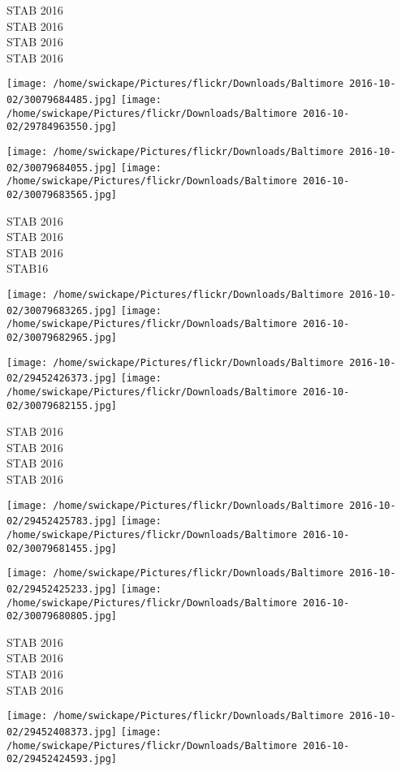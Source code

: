 \documentclass[10pt,letterpaper]{article}
\begin{document}
STAB 2016\\
STAB 2016\\
STAB 2016\\
STAB 2016
\pagebreak

\texttt{[image: /home/swickape/Pictures/flickr/Downloads/Baltimore 2016-10-02/30079684485.jpg]}
\texttt{[image: /home/swickape/Pictures/flickr/Downloads/Baltimore 2016-10-02/29784963550.jpg]}

\texttt{[image: /home/swickape/Pictures/flickr/Downloads/Baltimore 2016-10-02/30079684055.jpg]}
\texttt{[image: /home/swickape/Pictures/flickr/Downloads/Baltimore 2016-10-02/30079683565.jpg]}

STAB 2016\\
STAB 2016\\
STAB 2016\\
STAB16
\pagebreak

\texttt{[image: /home/swickape/Pictures/flickr/Downloads/Baltimore 2016-10-02/30079683265.jpg]}
\texttt{[image: /home/swickape/Pictures/flickr/Downloads/Baltimore 2016-10-02/30079682965.jpg]}

\texttt{[image: /home/swickape/Pictures/flickr/Downloads/Baltimore 2016-10-02/29452426373.jpg]}
\texttt{[image: /home/swickape/Pictures/flickr/Downloads/Baltimore 2016-10-02/30079682155.jpg]}

STAB 2016\\
STAB 2016\\
STAB 2016\\
STAB 2016
\pagebreak

\texttt{[image: /home/swickape/Pictures/flickr/Downloads/Baltimore 2016-10-02/29452425783.jpg]}
\texttt{[image: /home/swickape/Pictures/flickr/Downloads/Baltimore 2016-10-02/30079681455.jpg]}

\texttt{[image: /home/swickape/Pictures/flickr/Downloads/Baltimore 2016-10-02/29452425233.jpg]}
\texttt{[image: /home/swickape/Pictures/flickr/Downloads/Baltimore 2016-10-02/30079680805.jpg]}

STAB 2016\\
STAB 2016\\
STAB 2016\\
STAB 2016
\pagebreak

\texttt{[image: /home/swickape/Pictures/flickr/Downloads/Baltimore 2016-10-02/29452408373.jpg]}
\texttt{[image: /home/swickape/Pictures/flickr/Downloads/Baltimore 2016-10-02/29452424593.jpg]}
\end{document}

